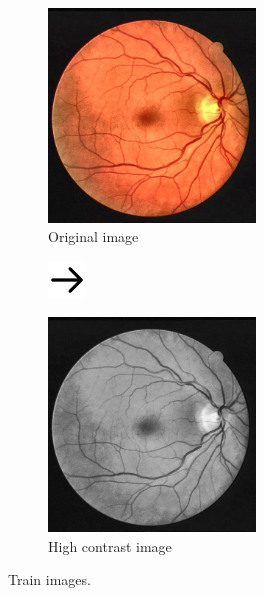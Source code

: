 \begin{frame}{\insertsectionhead}
  \begin{figure}[H]
    \begin{subfigure}{5.5cm}
      \includegraphics[width=5.5cm]{Graphics/high_contrast.jpg}
      \caption{Original image}
    \end{subfigure}
    \begin{subfigure}{1cm}
      \includegraphics[width=1cm]{Graphics/rightarrow.png}
    \end{subfigure}
    \begin{subfigure}{5.5cm}
      \includegraphics[width=5.5cm]{Graphics/grayscale.jpg}
      \caption{High contrast image}
    \end{subfigure}
    \caption{Train images.}
  \end{figure}
\end{frame}

